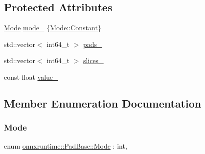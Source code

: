 \subsection*{Protected Attributes}
\begin{DoxyCompactItemize}
\item 
\mbox{\hyperlink{classonnxruntime_1_1PadBase_a9dccdf2fa457b3cd7322d0e79a2e53cb}{Mode}} \mbox{\hyperlink{classonnxruntime_1_1PadBase_aeae03e3dbb204b98dfe81c4a636fe92d}{mode\+\_\+}} \{\mbox{\hyperlink{classonnxruntime_1_1PadBase_a9dccdf2fa457b3cd7322d0e79a2e53cbacb17869fe51048b5a5c4c6106551a255}{Mode\+::\+Constant}}\}
\item 
std\+::vector$<$ int64\+\_\+t $>$ \mbox{\hyperlink{classonnxruntime_1_1PadBase_a6006078a8a2e5bb6eff4fc9343e4e9cf}{pads\+\_\+}}
\item 
std\+::vector$<$ int64\+\_\+t $>$ \mbox{\hyperlink{classonnxruntime_1_1PadBase_ab3a9aa2183eba840c2b0138623bbf84b}{slices\+\_\+}}
\item 
const float \mbox{\hyperlink{classonnxruntime_1_1PadBase_aa286f7814c0b9b8185adca26b40553af}{value\+\_\+}}
\end{DoxyCompactItemize}


\subsection{Member Enumeration Documentation}
\mbox{\label{classonnxruntime_1_1PadBase_a9dccdf2fa457b3cd7322d0e79a2e53cb}} 
\subsubsection{\texorpdfstring{Mode}{Mode}}
{\footnotesize\ttfamily enum \mbox{\hyperlink{classonnxruntime_1_1PadBase_a9dccdf2fa457b3cd7322d0e79a2e53cb}{onnxruntime\+::\+Pad\+Base\+::\+Mode}} \+: int\hspace{0.3cm}{\ttfamily [strong]}, {\ttfamily [protected]}}

